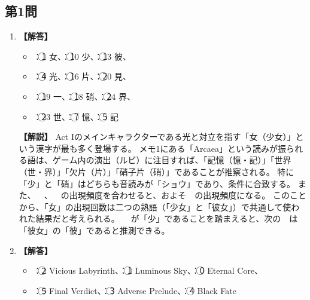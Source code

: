 \documentclass[uplatex,dvipdfmx,paper=a4paper,fontsize=11pt,jafontscale=0.9247,lang=ja]{jlreq}
\begin{document}
\subsection*{第1問}
\begin{enumerate}[label=(\arabic*)]
  \item \textbf{【解答】}
    \begin{itemize}[label={}, leftmargin=1em]
        \item {}：\textcircled{\scriptsize 1} 女、：\textcircled{\scriptsize 10} 少、：\textcircled{\scriptsize 13} 彼、
        \item {}：\textcircled{\scriptsize 4} 光、：\textcircled{\scriptsize 16} 片、：\textcircled{\scriptsize 20} 見、
        \item {}：\textcircled{\scriptsize 19} 一、：\textcircled{\scriptsize 18} 硝、：\textcircled{\scriptsize 24} 界、
        \item {}：\textcircled{\scriptsize 23} 世、：\textcircled{\scriptsize 7} 憶、：\textcircled{\scriptsize 5} 記
    \end{itemize}

    \textbf{【解説】}
    Act $\mathrm{I}$のメインキャラクターである光と対立を指す「女（少女）」という漢字が最も多く登場する。
    メモ1にある「Arcaea」という読みが振られる語は、ゲーム内の演出（ルビ）に注目すれば、「記憶（憶・記）」「世界（世・界）」「欠片（片）」「硝子片（硝）」であることが推察される。
    特に「少」と「硝」はどちらも音読みが「ショウ」であり、条件に合致する。
    また、~~、~~の出現頻度を合わせると、およそ~~の出現頻度になる。
    このことから、「女」の出現回数は二つの熟語（「少女」と「彼女」）で共通して使われた結果だと考えられる。
    ~~が「少」であることを踏まえると、次の~~は「彼女」の「彼」であると推測できる。

  \item \textbf{【解答】}
    \begin{itemize}[label={}, leftmargin=1em]
        \item {}：\textcircled{\scriptsize 2} Vicious Labyrinth、：\textcircled{\scriptsize 1} Luminous Sky、：\textcircled{\scriptsize 0} Eternal Core、
        \item {}：\textcircled{\scriptsize 5} Final Verdict、：\textcircled{\scriptsize 3} Adverse Prelude、：\textcircled{\scriptsize 4} Black Fate
    \end{itemize}


\end{enumerate}
\end{document}
